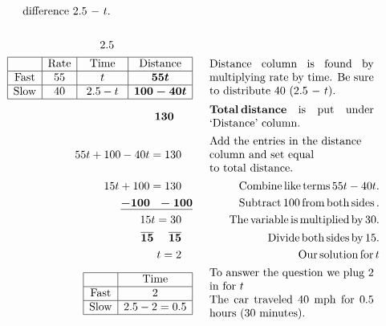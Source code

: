\begin{example}
\begin{eqnarray*}
\begin{array}{p{0.425\textwidth}}
      \tmop{difference} 2.5 $-~t$.
    \end{array}\\
    &  & \\
    2.5~~~~~~~~~~~~~~~~~~~~~ &  & \\
    \begin{array}{|c|c|c|c|}
      \hline
      & \tmop{Rate} & \tmop{Time} & \tmop{Distance}\\
      \hline
      \tmop{Fast} & 55 & t & \tmmathbf{55 t}\\
      \hline
      \tmop{Slow} & 40 & ~2.5 - t~ & \tmmathbf{100 - 40 t}\\
      \hline
    \end{array} &  & \begin{array}{p{0.425\textwidth}}
      \tmop{Distance} \tmop{column} \tmop{is} \tmop{found} \tmop{by}
      \tmop{multiplying} \tmop{rate} \tmop{by} \tmop{time}. \tmop{Be} \tmop{sure} \tmop{to} \tmop{distribute} 40 (2.5 $-~t$).
    \end{array}\\
    \tmmathbf{130}~~~~~  &  &  \begin{array}{p{0.425\textwidth}}
		\tmmathbf{\tmop{Total} \tmop{distance}} \tmop{is} \tmop{put} \tmop{under} \tmop{`Distance'} \tmop{column}.
		\end{array}\\
    55 t + 100 - 40 t = 130~~~ &  & \begin{array}{p{0.425\textwidth}}
      \tmop{Add~the~entries~in~the~distance} \tmop{column~and~set~equal} \tmop{to~total~distance}.
    \end{array}\\
    15 t + 100 = 130~~~ &  & \tmop{~Combine} \tmop{like} \tmop{terms} 55 t - 40
    t.\\
    \tmmathbf{\underline{- 100 ~~- 100}} &  & \tmop{~Subtract} 100 \tmop{from}
    \tmop{both} \tmop{sides}.\\
    15 t = 30~~~ &  & \tmop{~The} \tmop{variable} \tmop{is} \tmop{multiplied}
    \tmop{by} 30.\\
    \tmmathbf{\overline{15} ~~~~ \overline{15}}~~~ &  & \tmop{~Divide} \tmop{both}
    \tmop{sides} \tmop{by} 15.\\
    t = 2~~~ &  & \tmop{~Our} \tmop{solution} \tmop{for} t\\
    \begin{array}{|c|c|}
      \hline
      & \tmop{Time}\\
      \hline
      \tmop{Fast} & 2\\
      \hline
      \tmop{Slow} & 2.5 - 2 = 0.5\\
      \hline
    \end{array} &  & \begin{array}{p{0.425\textwidth}}
      \tmop{To} \tmop{answer} \tmop{the} \tmop{question} \tmop{we} \tmop{plug}
      2 \tmop{in} \tmop{for} $t$\\
      \tmop{The} \tmop{car} \tmop{traveled} 40 \tmop{mph} \tmop{for} 0.5
      \tmop{hours} (30 \tmop{minutes}).
    \end{array}
  \end{eqnarray*}
\end{example}